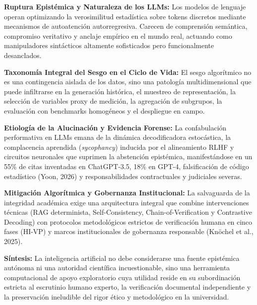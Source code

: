 \begin{resumenlist}
    \item \textbf{Ruptura Epistémica y Naturaleza de los LLMs:} Los modelos de lenguaje operan optimizando la verosimilitud estadística sobre tokens discretos mediante mecanismos de autoatención autorregresiva. Carecen de comprensión semántica, compromiso veritativo y anclaje empírico en el mundo real, actuando como manipuladores sintácticos altamente sofisticados pero funcionalmente desanclados.
    \item \textbf{Taxonomía Integral del Sesgo en el Ciclo de Vida:} El sesgo algorítmico no es una contingencia aislada de los datos, sino una patología multidimensional que puede infiltrarse en la generación histórica, el muestreo de representación, la selección de variables proxy de medición, la agregación de subgrupos, la evaluación con benchmarks homogéneos y el despliegue en campo.
    \item \textbf{Etiología de la Alucinación y Evidencia Forense:} La confabulación performativa en LLMs emana de la dinámica decodificadora estocástica, la complacencia aprendida (\textit{sycophancy}) inducida por el alineamiento RLHF y circuitos neuronales que suprimen la abstención epistémica, manifestándose en un 55\% de citas inventadas en ChatGPT-3.5, 18\% en GPT-4, falsificación de código estadístico (Yoon, 2026) y responsabilidades contractuales y judiciales severas.
    \item \textbf{Mitigación Algorítmica y Gobernanza Institucional:} La salvaguarda de la integridad académica exige una arquitectura integral que combine intervenciones técnicas (RAG determinista, Self-Consistency, Chain-of-Verification y Contrastive Decoding) con protocolos metodológicos estrictos de verificación humana en cinco fases (HI-VP) y marcos institucionales de gobernanza responsable (Knöchel et al., 2025).
\end{resumenlist}

\vspace{0.6cm}
\begin{cajabeige}
\textbf{Síntesis:} La inteligencia artificial no debe considerarse una fuente epistémica autónoma ni una autoridad científica incuestionable, sino una herramienta computacional de apoyo exploratorio cuya utilidad reside en su subordinación estricta al escrutinio humano experto, la verificación documental independiente y la preservación ineludible del rigor ético y metodológico en la universidad.
\end{cajabeige}

